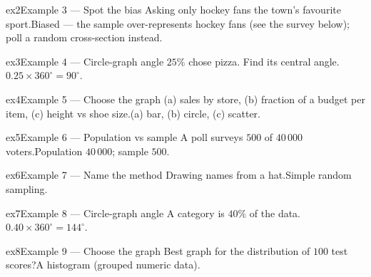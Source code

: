 \documentclass[11pt]{article}
\begin{document}
\begin{example}{ex2}{Example 3 --- Spot the bias}
Asking only hockey fans the town's favourite sport.\soln Biased — the sample over-represents hockey fans (see the survey below); poll a random cross-section instead.\begin{center}\end{center}
\end{example}

\begin{example}{ex3}{Example 4 --- Circle-graph angle}
$25\%$ chose pizza. Find its central angle.\soln $0.25\times360^\circ=90^\circ$.
\end{example}

\begin{example}{ex4}{Example 5 --- Choose the graph}
(a) sales by store, (b) fraction of a budget per item, (c) height vs shoe size.\soln (a) bar, (b) circle, (c) scatter.
\end{example}

\begin{example}{ex5}{Example 6 --- Population vs sample}
A poll surveys $500$ of $40\,000$ voters.\soln Population $40\,000$; sample $500$.
\end{example}

\begin{example}{ex6}{Example 7 --- Name the method}
Drawing names from a hat.\soln Simple random sampling.
\end{example}

\begin{example}{ex7}{Example 8 --- Circle-graph angle}
A category is $40\%$ of the data.\soln $0.40\times360^\circ=144^\circ$.
\end{example}

\begin{example}{ex8}{Example 9 --- Choose the graph}
Best graph for the distribution of $100$ test scores?\soln A histogram (grouped numeric data).
\end{example}
\end{document}
